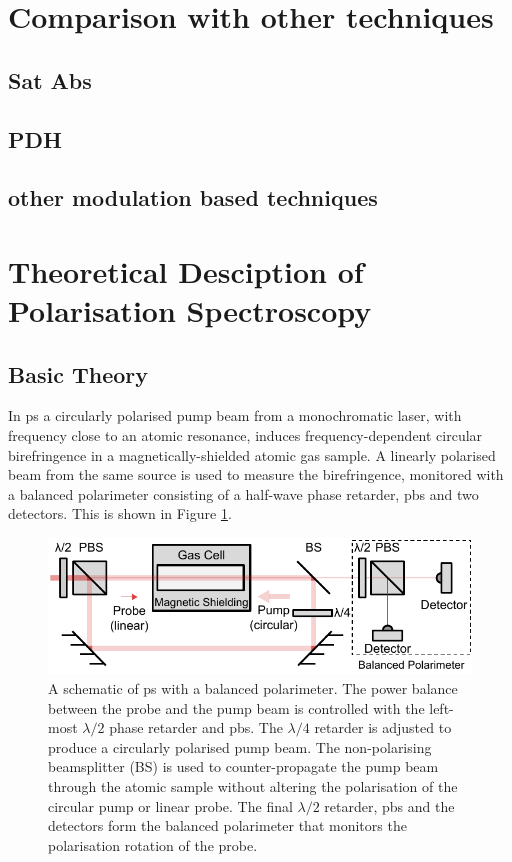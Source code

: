 \section{Comparison with other techniques}
\subsection{Sat Abs}
\subsection{PDH}
\subsection{other modulation based techniques}
\section{Theoretical Desciption of Polarisation Spectroscopy}\label{section:pol_spec_theory}
\subsection{Basic Theory}

In \gls{ps} a circularly polarised pump beam from a monochromatic laser, with frequency close to an atomic resonance, induces frequency-dependent circular birefringence in a magnetically-shielded atomic gas sample.
A linearly polarised beam from the same source is used to measure the birefringence, monitored with a balanced polarimeter consisting of a half-wave phase retarder, \gls{pbs} and two detectors. This is shown in Figure \ref{figure:pol_spec_schematic}.

\begin{figure}
\centering
\includegraphics[width=\linewidth]{chapter1/Figs/PolSpecSchematic.pdf}
\caption{A schematic of \gls{ps} with a balanced polarimeter. The power balance between the probe and the pump beam is controlled with the left-most $\lambda/2$ phase retarder and \gls{pbs}. The $\lambda/4$ retarder is adjusted to produce a circularly polarised pump beam. The non-polarising beamsplitter (BS) is used to counter-propagate the pump beam through the atomic sample without altering the polarisation of the circular pump or linear probe. The final $\lambda/2$ retarder, \gls{pbs} and the detectors form the balanced polarimeter that monitors the polarisation rotation of the probe.}
\label{figure:pol_spec_schematic}
\end{figure}

